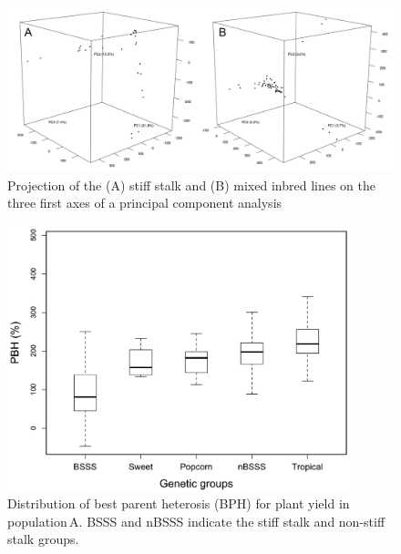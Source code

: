 \documentclass[12pt]{article}
\begin{document}
\begin{figure}[h]
  \begin{center}
   \includegraphics[width=150mm]{PCA.png}
    \caption{Projection of the (A) stiff stalk and (B) mixed inbred lines on the three first axes of a principal component analysis}
   \label{figureS3}
  \end{center}
\end{figure}


\begin{figure}[h]
  \begin{center}
   \includegraphics[width=100mm]{BoxplotBPH.png}
    \caption{Distribution of best parent heterosis (BPH) for plant yield in population\,A. BSSS and nBSSS indicate the stiff stalk and non-stiff stalk groups.}
   \label{figureS4}
  \end{center}
\end{figure}
\end{document}

